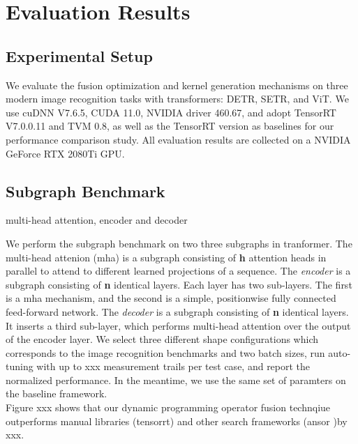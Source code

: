 
\section{Evaluation Results}
\subsection{Experimental Setup}

We evaluate the fusion optimization and kernel generation mechanisms on three modern image recognition tasks with transformers: DETR, SETR, and ViT. %
We use cuDNN V7.6.5, CUDA 11.0, NVIDIA driver 460.67, and adopt TensorRT V7.0.0.11 and TVM 0.8, as well as the TensorRT version as 
baselines for our performance comparison study. All evaluation results are collected on a NVIDIA GeForce RTX 2080Ti GPU. 






\subsection{Subgraph Benchmark}
{\color{red} multi-head attention, encoder and decoder}

We perform the subgraph benchmark on two three subgraphs in tranformer. The multi-head attenion (mha) is a subgraph consisting of \textbf{h} attention heads in parallel
to attend to different learned projections of a sequence. The \textit{encoder} is a subgraph consisting of \textbf{n} identical layers. Each layer has two sub-layers. The first is a mha mechanism, and the second is a simple,
positionwise fully connected feed-forward network. The \textit{decoder} is a subgraph consisting of \textbf{n} identical layers. It inserts a third sub-layer, which performs multi-head attention over the output of 
the encoder layer. We select three different shape configurations which corresponds to the image recognition benchmarks and two batch sizes, run auto-tuning with up to xxx
measurement trails per test case, and report the normalized performance. In the meantime, we use the same set of paramters on the baseline framework. \\
Figure xxx shows that our dynamic programming operator fusion technqiue outperforms manual libraries (tensorrt) and other search frameworks (ansor )by xxx.


